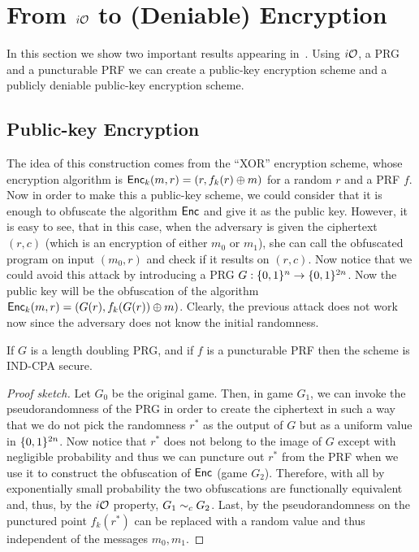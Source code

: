 \section{From $i\mathcal{O}$ to (Deniable) Encryption}
In this section we show two important results appearing in~\cite{iO-deniable}. Using $i\mathcal{O}$, a PRG and a puncturable PRF we can create a public-key encryption scheme and a publicly deniable public-key encryption scheme.

\subsection{Public-key Encryption}
The idea of this construction comes from the ``XOR'' encryption scheme, whose encryption algorithm is $\mathsf{Enc}_k(m,r)=(r,f_k(r)\oplus m)$ for a random $r$ and a PRF $f$. Now in order to make this a public-key scheme, we could consider that it is enough to obfuscate the algorithm $\mathsf{Enc}$ and give it as the public key. However, it is easy to see, that in this case, when the adversary is given the ciphertext $(r,c)$ (which is an encryption of either $m_0$ or $m_1$), she can call the obfuscated program on input $(m_0,r)$ and check if it results on $(r,c)$. Now notice that we could avoid this attack by introducing a PRG $G:\{0,1\}^n\to\{0,1\}^{2n}$. Now the public key will be the obfuscation of the algorithm $\mathsf{Enc}_k(m,r)=(G(r),f_k(G(r))\oplus m)$. Clearly, the previous attack does not work now since the adversary does not know the initial randomness.

\begin{mytheorem}
If $G$ is a length doubling PRG, and if $f$ is a puncturable PRF then the scheme is IND-CPA secure.
\end{mytheorem}
\begin{proof}[Proof sketch]
Let $G_0$ be the original game. Then, in game $G_1$, we can invoke the pseudorandomness of the PRG in order to create the ciphertext in such a way that we do not pick the randomness $r^*$ as the output of $G$ but as a uniform value in $\{0,1\}^{2n}$. Now notice that $r^*$ does not belong to the image of $G$ except with negligible probability and thus we can puncture out $r^*$ from the PRF when we use it to construct the obfuscation of $\mathsf{Enc}$ (game $G_2$). Therefore, with all by exponentially small probability the two obfuscations are functionally equivalent and, thus, by the $i\mathcal{O}$ property, $G_1\sim_c G_2$. Last, by the pseudorandomness on the punctured point $f_k(r^*)$ can be replaced with a random value and thus independent of the messages $m_0,m_1$. 
\end{proof}

